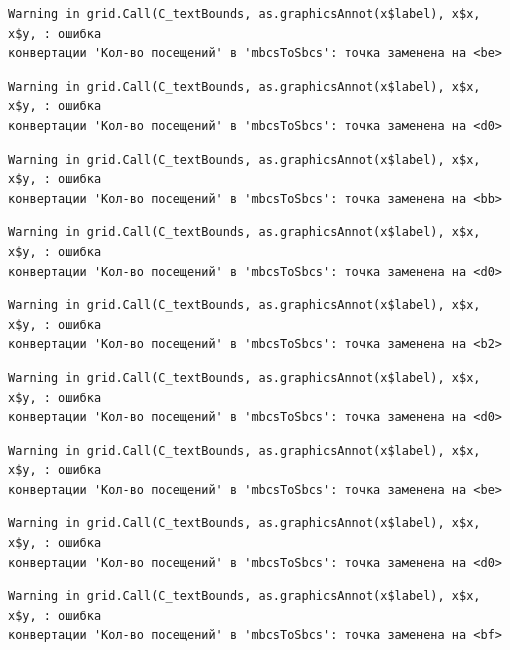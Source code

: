 \documentclass[
  letterpaper,
  DIV=11,
  numbers=noendperiod]{scrreprt}
\begin{document}
\begin{verbatim}
Warning in grid.Call(C_textBounds, as.graphicsAnnot(x$label), x$x, x$y, : ошибка
конвертации 'Кол-во посещений' в 'mbcsToSbcs': точка заменена на <be>
\end{verbatim}

\begin{verbatim}
Warning in grid.Call(C_textBounds, as.graphicsAnnot(x$label), x$x, x$y, : ошибка
конвертации 'Кол-во посещений' в 'mbcsToSbcs': точка заменена на <d0>
\end{verbatim}

\begin{verbatim}
Warning in grid.Call(C_textBounds, as.graphicsAnnot(x$label), x$x, x$y, : ошибка
конвертации 'Кол-во посещений' в 'mbcsToSbcs': точка заменена на <bb>
\end{verbatim}

\begin{verbatim}
Warning in grid.Call(C_textBounds, as.graphicsAnnot(x$label), x$x, x$y, : ошибка
конвертации 'Кол-во посещений' в 'mbcsToSbcs': точка заменена на <d0>
\end{verbatim}

\begin{verbatim}
Warning in grid.Call(C_textBounds, as.graphicsAnnot(x$label), x$x, x$y, : ошибка
конвертации 'Кол-во посещений' в 'mbcsToSbcs': точка заменена на <b2>
\end{verbatim}

\begin{verbatim}
Warning in grid.Call(C_textBounds, as.graphicsAnnot(x$label), x$x, x$y, : ошибка
конвертации 'Кол-во посещений' в 'mbcsToSbcs': точка заменена на <d0>
\end{verbatim}

\begin{verbatim}
Warning in grid.Call(C_textBounds, as.graphicsAnnot(x$label), x$x, x$y, : ошибка
конвертации 'Кол-во посещений' в 'mbcsToSbcs': точка заменена на <be>
\end{verbatim}

\begin{verbatim}
Warning in grid.Call(C_textBounds, as.graphicsAnnot(x$label), x$x, x$y, : ошибка
конвертации 'Кол-во посещений' в 'mbcsToSbcs': точка заменена на <d0>
\end{verbatim}

\begin{verbatim}
Warning in grid.Call(C_textBounds, as.graphicsAnnot(x$label), x$x, x$y, : ошибка
конвертации 'Кол-во посещений' в 'mbcsToSbcs': точка заменена на <bf>
\end{verbatim}
\end{document}

